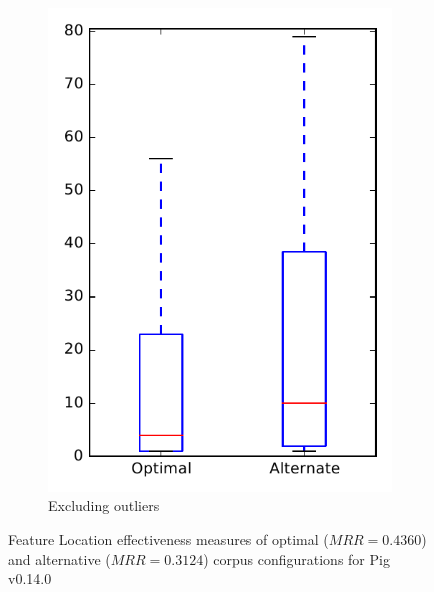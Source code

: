\begin{figure}
\begin{subfigure}{.4\textwidth}
        \includegraphics[height=0.4\textheight]{figures/combo/flt_rq2_pig_no_outlier}
        \caption{Excluding outliers}\label{fig:combo:flt:rq2:pig_no_outlier}
    \end{subfigure}
\caption[Feature Location effectiveness measures of optimal and alternative corpus configurations for Pig v0.14.0]%
{Feature Location effectiveness measures of optimal ($MRR=0.4360$) and alternative ($MRR=0.3124$) corpus configurations for Pig v0.14.0}
\label{fig:combo:flt:rq2:pig}
\end{figure}
